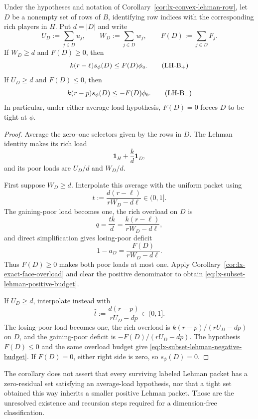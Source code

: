 \begin{corollary}
\label{cor:lx-subset-lehman-face-budget}
Under the hypotheses and notation of
Corollary~\ref{cor:lx-convex-lehman-row}, let $D$ be a nonempty set of rows
of $B$, identifying row indices with the corresponding rich players in
$H$.  Put $d=|D|$ and write
\[
 U_D:=\sum_{j\in D}u_j,\qquad
 W_D:=\sum_{j\in D}w_j,\qquad
 F(D):=\sum_{j\in D}F_j.
\]
If $W_D\geq d$ and $F(D)\geq0$, then
\[
 k(r-\ell)s_\phi(D)\leq F(D)\phi_a.                \tag{LH-B${}_+$}
 \label{eq:lx-subset-lehman-positive-budget}
\]
If $U_D\geq d$ and $F(D)\leq0$, then
\[
 k(r-p)s_\phi(D)\leq-F(D)\phi_b.                  \tag{LH-B${}_-$}
 \label{eq:lx-subset-lehman-negative-budget}
\]
In particular, under either average-load hypothesis, $F(D)=0$ forces $D$ to
be tight at $\phi$.
\end{corollary}

\begin{proof}
Average the zero--one selectors given by the rows in $D$.  The Lehman
identity makes its rich load
\[
 \mathbf1_H+\frac{k}{d}\mathbf1_D,
\]
and its poor loads are $U_D/d$ and $W_D/d$.

First suppose $W_D\geq d$.  Interpolate this average with the uniform packet
using
\[
 t:=\frac{d(r-\ell)}{rW_D-d\ell}\in(0,1].
\]
The gaining-poor load becomes one, the rich overload on $D$ is
\[
 q=\frac{tk}{d}=\frac{k(r-\ell)}{rW_D-d\ell},
\]
and direct simplification gives losing-poor deficit
\[
 1-a_D=\frac{F(D)}{rW_D-d\ell}.
\]
Thus $F(D)\geq0$ makes both poor loads at most one.  Apply
Corollary~\ref{cor:lx-exact-face-overload} and clear the positive denominator
to obtain \eqref{eq:lx-subset-lehman-positive-budget}.

If $U_D\geq d$, interpolate instead with
\[
 \widehat t:=\frac{d(r-p)}{rU_D-dp}\in(0,1].
\]
The losing-poor load becomes one, the rich overload is
$k(r-p)/(rU_D-dp)$ on $D$, and the gaining-poor deficit is
$-F(D)/(rU_D-dp)$.  The hypothesis $F(D)\leq0$ and the same overload budget
give \eqref{eq:lx-subset-lehman-negative-budget}.  If $F(D)=0$, either right
side is zero, so $s_\phi(D)=0$.
\end{proof}

The corollary does not assert that every surviving labeled Lehman packet has
a zero-residual set satisfying an average-load hypothesis, nor that a tight
set obtained this way inherits a smaller positive Lehman packet.  Those are
the unresolved existence and recursion steps required for a dimension-free
classification.

